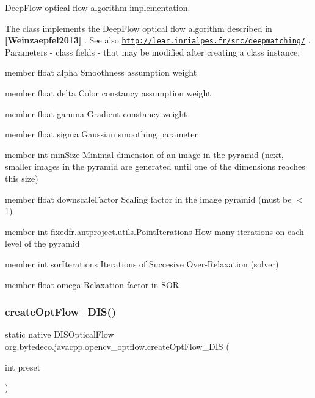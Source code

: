 Deep\+Flow optical flow algorithm implementation. 

The class implements the Deep\+Flow optical flow algorithm described in {\bfseries [Weinzaepfel2013]} . See also \href{http://lear.inrialpes.fr/src/deepmatching/}{\tt http\+://lear.\+inrialpes.\+fr/src/deepmatching/} . Parameters -\/ class fields -\/ that may be modified after creating a class instance\+:
\begin{DoxyItemize}
\item member float alpha Smoothness assumption weight
\item member float delta Color constancy assumption weight
\item member float gamma Gradient constancy weight
\item member float sigma Gaussian smoothing parameter
\item member int min\+Size Minimal dimension of an image in the pyramid (next, smaller images in the pyramid are generated until one of the dimensions reaches this size)
\item member float downscale\+Factor Scaling factor in the image pyramid (must be $<$ 1)
\item member int fixed\+fr.antproject.utils.Point\+Iterations How many iterations on each level of the pyramid
\item member int sor\+Iterations Iterations of Succesive Over-\/\+Relaxation (solver)
\item member float omega Relaxation factor in S\+OR 
\end{DoxyItemize}\mbox{\label{group__optflow_gac107283f5dba4f320df3d9894aad537b}} 
\subsubsection{\texorpdfstring{create\+Opt\+Flow\+\_\+\+D\+I\+S()}{createOptFlow\_DIS()}}
{\footnotesize\ttfamily static native D\+I\+S\+Optical\+Flow org.\+bytedeco.\+javacpp.\+opencv\+\_\+optflow.\+create\+Opt\+Flow\+\_\+\+D\+IS (\begin{DoxyParamCaption}\item[{int}]{preset }\end{DoxyParamCaption})\hspace{0.3cm}{\ttfamily [static]}}



